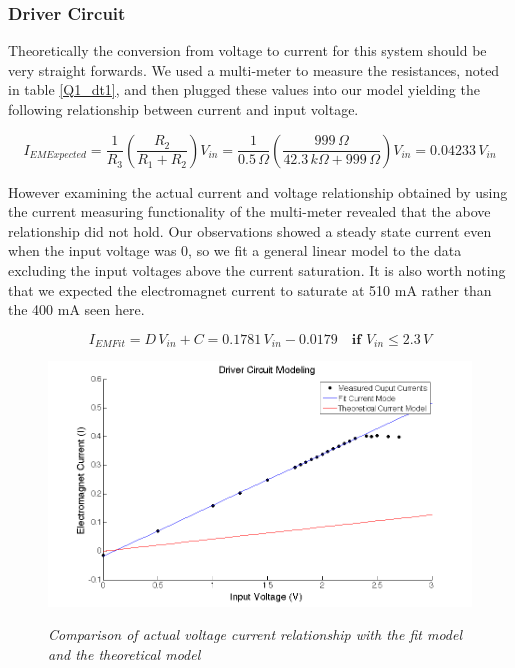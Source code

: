 \documentclass{article}
\theoremstyle{plain}
\theoremstyle{definition}
\theoremstyle{remark}
\begin{document}
\subsubsection*{Driver Circuit}

Theoretically the conversion from voltage to current for this system should be very straight forwards.  We used a multi-meter to measure the resistances, noted in table \ref{Q1_dt1}, and then plugged these values into our model yielding the following relationship between current and input voltage.

$$ I_{EM Expected}=\frac{1}{R_3}\left(\frac{R_2}{R_1+R_2}\right)V_{in} = \frac{1}{0.5 \,\Omega}\left(\frac{999 \,\Omega}{42.3 \,k\Omega + 999 \,\Omega}\right)V_{in} = 0.04233 \, V_{in}$$

However examining the actual current and voltage relationship obtained by using the current measuring functionality of the multi-meter revealed that the above relationship did not hold.  Our observations showed a steady state current even when the input voltage was 0, so we fit a general linear model to the data excluding the input voltages above the current saturation.  It is also worth noting that we expected the electromagnet current to saturate at 510 mA rather than the 400 mA seen here.

$$ I_{EM Fit} = D \, V_{in} + C = 0.1781 \, V_{in} - 0.0179  \quad \textbf{if } V_{in} \leq 2.3 \, V $$

\begin{figure}
\begin{center}
\includegraphics[width = 13cm]{DriverCircuitModel.png}
\label{Q1_d2}
\caption{\emph{Comparison of actual voltage current relationship with the fit model and the theoretical model}}
\end{center}
\end{figure}
\end{document}
